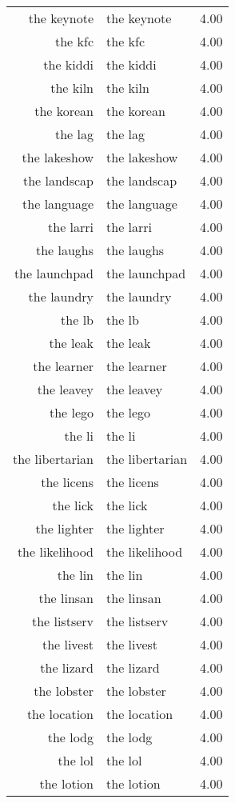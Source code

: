 \begin{table}[ht]
\begin{tabular}{rlr}
  the keynote & the keynote & 4.00 \\ 
  the kfc & the kfc & 4.00 \\ 
  the kiddi & the kiddi & 4.00 \\ 
  the kiln & the kiln & 4.00 \\ 
  the korean & the korean & 4.00 \\ 
  the lag & the lag & 4.00 \\ 
  the lakeshow & the lakeshow & 4.00 \\ 
  the landscap & the landscap & 4.00 \\ 
  the language & the language & 4.00 \\ 
  the larri & the larri & 4.00 \\ 
  the laughs & the laughs & 4.00 \\ 
  the launchpad & the launchpad & 4.00 \\ 
  the laundry & the laundry & 4.00 \\ 
  the lb & the lb & 4.00 \\ 
  the leak & the leak & 4.00 \\ 
  the learner & the learner & 4.00 \\ 
  the leavey & the leavey & 4.00 \\ 
  the lego & the lego & 4.00 \\ 
  the li & the li & 4.00 \\ 
  the libertarian & the libertarian & 4.00 \\ 
  the licens & the licens & 4.00 \\ 
  the lick & the lick & 4.00 \\ 
  the lighter & the lighter & 4.00 \\ 
  the likelihood & the likelihood & 4.00 \\ 
  the lin & the lin & 4.00 \\ 
  the linsan & the linsan & 4.00 \\ 
  the listserv & the listserv & 4.00 \\ 
  the livest & the livest & 4.00 \\ 
  the lizard & the lizard & 4.00 \\ 
  the lobster & the lobster & 4.00 \\ 
  the location & the location & 4.00 \\ 
  the lodg & the lodg & 4.00 \\ 
  the lol & the lol & 4.00 \\ 
  the lotion & the lotion & 4.00 \\ 

\end{tabular}
\end{table}
